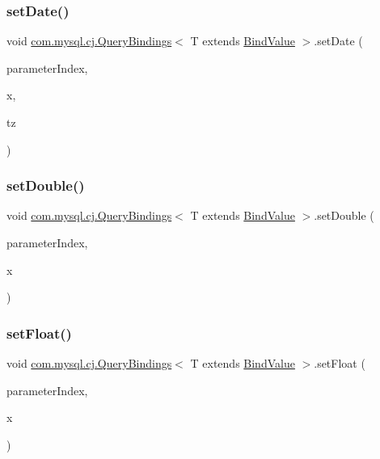 \subsubsection{\texorpdfstring{set\+Date()}{setDate()}\hspace{0.1cm}{\footnotesize\ttfamily [3/3]}}
{\footnotesize\ttfamily void \mbox{\hyperlink{interfacecom_1_1mysql_1_1cj_1_1_query_bindings}{com.\+mysql.\+cj.\+Query\+Bindings}}$<$ T extends \mbox{\hyperlink{interfacecom_1_1mysql_1_1cj_1_1_bind_value}{Bind\+Value}} $>$.set\+Date (\begin{DoxyParamCaption}\item[{int}]{parameter\+Index,  }\item[{Date}]{x,  }\item[{Time\+Zone}]{tz }\end{DoxyParamCaption})}

\mbox{\label{interfacecom_1_1mysql_1_1cj_1_1_query_bindings_abb2dc0f5ac5f8285d522f5bd1c24083b}} 
\subsubsection{\texorpdfstring{set\+Double()}{setDouble()}}
{\footnotesize\ttfamily void \mbox{\hyperlink{interfacecom_1_1mysql_1_1cj_1_1_query_bindings}{com.\+mysql.\+cj.\+Query\+Bindings}}$<$ T extends \mbox{\hyperlink{interfacecom_1_1mysql_1_1cj_1_1_bind_value}{Bind\+Value}} $>$.set\+Double (\begin{DoxyParamCaption}\item[{int}]{parameter\+Index,  }\item[{double}]{x }\end{DoxyParamCaption})}

\mbox{\label{interfacecom_1_1mysql_1_1cj_1_1_query_bindings_a47df49247d757f910257c813cb264d80}} 
\subsubsection{\texorpdfstring{set\+Float()}{setFloat()}}
{\footnotesize\ttfamily void \mbox{\hyperlink{interfacecom_1_1mysql_1_1cj_1_1_query_bindings}{com.\+mysql.\+cj.\+Query\+Bindings}}$<$ T extends \mbox{\hyperlink{interfacecom_1_1mysql_1_1cj_1_1_bind_value}{Bind\+Value}} $>$.set\+Float (\begin{DoxyParamCaption}\item[{int}]{parameter\+Index,  }\item[{float}]{x }\end{DoxyParamCaption})}

